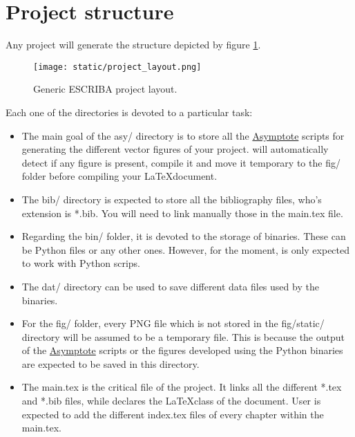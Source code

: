 \section{Project structure}

Any \ESCRIBA project will generate the structure depicted by figure
\ref{fig:project_layout}.

\begin{figure}[h]
  \centering
  \texttt{[image: static/project\_layout.png]}
  \caption{Generic ESCRIBA project layout.}
  \label{fig:project_layout}
\end{figure}

Each one of the directories is devoted to a particular task:

\begin{itemize}

  \item The main goal of the asy/ directory is to store all the
        \href{https://asymptote.sourceforge.io/}{Asymptote} scripts for generating the different
        vector figures of your project. \ESCRIBA will automatically detect if
        any figure is present, compile it and move it temporary to the fig/
        folder before compiling your \LaTeX document.

  \item The bib/ directory is expected to store all the bibliography files,
        who's extension is *.bib. You will need to link manually those in the
        main.tex file.

  \item Regarding the bin/ folder, it is devoted to the storage of binaries.
        These can be Python files or any other ones. However, for the moment,
        \ESCRIBA is only expected to work with Python scrips.

  \item The dat/ directory can be used to save different data files used by the
        binaries.

  \item For the fig/ folder, every PNG file which is not stored in the
        fig/static/ directory will be assumed to be a temporary file. This is
        because the output of the
        \href{https://asymptote.sourceforge.io/}{Asymptote} scripts or the
        figures developed using the Python binaries are expected to be saved
        in this directory.

  \item The main.tex is the critical file of the project. It links all the
        different *.tex and *.bib files, while declares the \LaTeX class of
        the document. User is expected to add the different index.tex files of
        every chapter within the main.tex.


\end{itemize}
